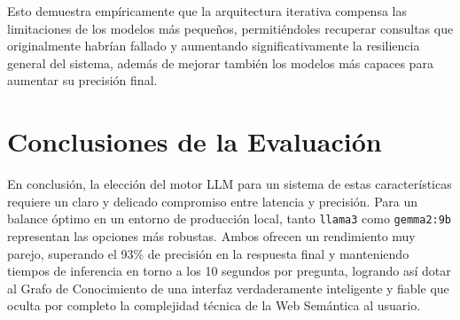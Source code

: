 Esto demuestra empíricamente que la arquitectura iterativa compensa las limitaciones de los modelos más pequeños, permitiéndoles recuperar consultas que originalmente habrían fallado y aumentando significativamente la resiliencia general del sistema, además de mejorar también los modelos más capaces para aumentar su precisión final.

\section{Conclusiones de la Evaluación}

En conclusión, la elección del motor LLM para un sistema de estas características requiere un claro y delicado compromiso entre latencia y precisión. Para un balance óptimo en un entorno de producción local, tanto \texttt{llama3} como \texttt{gemma2:9b} representan las opciones más robustas. Ambos ofrecen un rendimiento muy parejo, superando el 93\% de precisión en la respuesta final y manteniendo tiempos de inferencia en torno a los 10 segundos por pregunta, logrando así dotar al Grafo de Conocimiento de una interfaz verdaderamente inteligente y fiable que oculta por completo la complejidad técnica de la Web Semántica al usuario.
